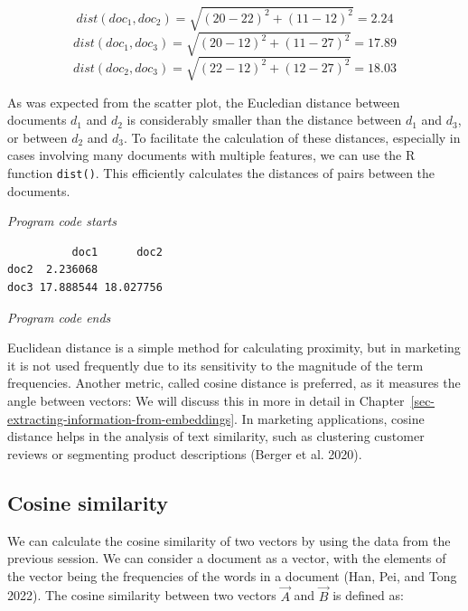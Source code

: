 \[
dist(doc_1, doc_2)=\sqrt{(20-22)^2+(11-12)^2}=2.24 
\] \[
dist(doc_1, doc_3)=\sqrt{(20-12)^2+(11-27)^2}=17.89
\] \[
dist(doc_2, doc_3)=\sqrt{(22-12)^2+(12-27)^2}=18.03
\]

As was expected from the scatter plot, the Eucledian distance between
documents \(d_1\) and \(d_2\) is considerably smaller than the distance
between \(d_1\) and \(d_3\), or between \(d_2\) and \(d_3\). To
facilitate the calculation of these distances, especially in cases
involving many documents with multiple features, we can use the R
function \texttt{dist()}. This efficiently calculates the
distances of pairs between the documents.

\emph{Program code starts}

\begin{Shaded}
\begin{Highlighting}[]
\end{Highlighting}
\end{Shaded}

\begin{verbatim}
          doc1      doc2
doc2  2.236068          
doc3 17.888544 18.027756
\end{verbatim}

\emph{Program code ends}

Euclidean distance is a simple method for calculating proximity, but
in marketing it is not used frequently due to its sensitivity to the
magnitude of the term frequencies. Another metric, called cosine
distance is preferred, as it measures the angle between vectors: We will
discuss this in more in detail in
Chapter~\ref{sec-extracting-information-from-embeddings}. In marketing
applications, cosine distance helps in the analysis of text similarity, such as
clustering customer reviews or segmenting product descriptions (Berger
et al. 2020).

\subsection{Cosine similarity}\label{cosine-similarity}

We can calculate the cosine similarity of two vectors by using the
data from the previous session. We can consider a document
as a vector, with the elements of the vector being the frequencies of the words
in a document (Han, Pei, and Tong 2022). The cosine similarity
between two vectors \(\vec{A}\) and \(\vec{B}\) is defined as:

